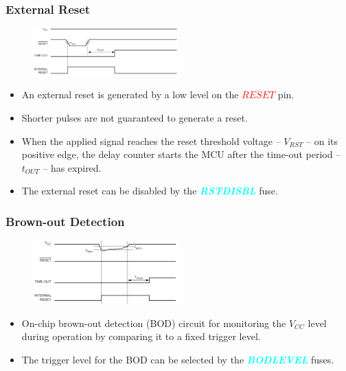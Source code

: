 \documentclass{article}
\newcommand{\bitFormat}[1]{\emph{\textbf{\textcolor{cyan}{#1}}}}
\newcommand{\pinFormat}[1]{\emph{\textcolor{red}{#1}}}
\begin{document}
\subsubsection{External Reset}
\begin{figure}[H]
    \begin{center}
        \includegraphics[width=0.5\textwidth]{externalReset.png}
    \end{center}
\end{figure}
\begin{itemize}
    \item An external reset is generated by a low level on the \pinFormat{$\overline{RESET}$}  pin.
    \item Shorter pulses are not guaranteed to generate a reset.
    \item When the applied signal reaches the reset threshold voltage – $V_{RST}$ – on its positive edge, the delay counter starts the MCU after the time-out period – $t_{OUT}$ – has expired.
    \item The external reset can be disabled by the \bitFormat{RSTDISBL} fuse.
\end{itemize}

\subsubsection{Brown-out Detection}
\begin{figure}[H]
    \begin{center}
        \includegraphics[width=0.5\textwidth]{brownOutReset.png}
    \end{center}
\end{figure}
\begin{itemize}
    \item On-chip brown-out detection (BOD) circuit for monitoring the $V_{CC}$ level during operation by comparing it to a fixed trigger level.
    \item The trigger level for the BOD can be selected by the \bitFormat{BODLEVEL} fuses.
\end{itemize}
\end{document}
